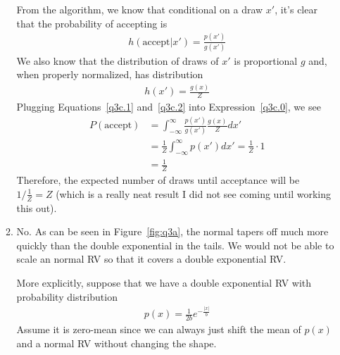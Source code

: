 \documentclass[12pt]{article}
\theoremstyle{plain}
\theoremstyle{definition}
\theoremstyle{remark}
\begin{document}
\begin{enumerate}
\begin{enumerate}
        From the algorithm, we know that conditional on a draw $x'$,
        it's clear that the probability of accepting is
        \begin{align}
          h(\text{accept}|x') = \frac{p(x')}{g(x')}
          \label{q3c.1}
        \end{align}
        We also know that the distribution of draws of $x'$ is
        proportional $g$ and, when properly normalized, has distribution
        \begin{align}
          h(x') = \frac{g(x)}{Z}
          \label{q3c.2}
        \end{align}
        Plugging Equations~\ref{q3c.1} and~\ref{q3c.2} into
        Expression~\ref{q3c.0}, we see
        \begin{align}
          P(\text{accept})
          &= \int_{-\infty}^\infty \frac{p(x')}{g(x')} \frac{g(x)}{Z} dx'\\
          &= \frac{1}{Z}\int_{-\infty}^\infty p(x') dx'
          = \frac{1}{Z} \cdot 1\\
          &= \frac{1}{Z}
        \end{align}
        Therefore, the expected number of draws until acceptance will be
        $1/\frac{1}{Z} = Z$ (which is a really neat result I did not see
        coming until working this out).

      \item %
        No. As can be seen in Figure~\ref{fig:q3a}, the normal tapers
        off much more quickly than the double exponential in the tails.
        We would not be able to scale an normal RV so that it covers
        a double exponential RV.

        More explicitly, suppose that we have a double exponential RV
        with probability distribution
        \begin{align*}
          p(x) = \frac{1}{2b} e^{-\frac{|x|}{b}}
        \end{align*}
        Assume it is zero-mean since we can always just shift the mean
        of $p(x)$ and a normal RV without changing the shape.


\end{enumerate}
\end{enumerate}
\end{document}
